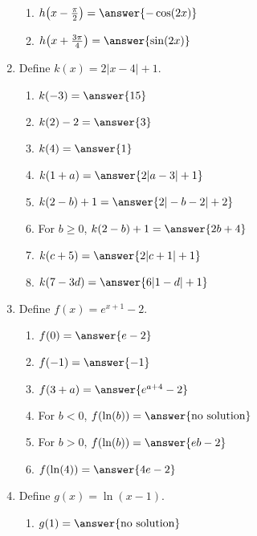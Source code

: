 \documentclass{ximera}
\begin{document}
\begin{exercise}
\begin{enumerate}
\begin{enumerate}
\item $h\!\left(x-\frac{\pi}{2}\right) = \answer{-\cos(2x)}$

\item $h\!\left(x+\frac{3\pi}{4}\right) = \answer{\sin(2x)}$
\end{enumerate}


\item Define $k(x)= 2|x-4|+1$.
\begin{enumerate}
\item $k(-3) = \answer{15}$

\item $k(2) -2 = \answer{3}$

\item $k(4) = \answer{1}$

\item $k(1+a)=\answer{2|a-3| +1}$

\item $k(2-b) +1 = \answer{2|-b-2|+2}$

\item For $b\geq0$, $k(2-b) +1 = \answer{2b+4}$

\item $k(c+5) = \answer{2|c+1|+1}$

\item $k(7-3d) = \answer{6|1-d|+1}$
\end{enumerate}

\item Define $f(x)= e^{x+1} -2$.
\begin{enumerate}
\item $f(0) = \answer{e-2}$

\item $f(-1) = \answer{-1}$

\item $f(3+a)=\answer{e^{a+4}-2}$

\item For $b<0$, $f(\ln(b)) = \answer{\text{no solution}}$

\item For $b>0$, $f(\ln(b)) = \answer{eb-2}$

\item $f(\ln(4)) = \answer{4e-2}$
\end{enumerate}

\item Define $g(x)= \ln(x-1)$.
\begin{enumerate}
\item $g(1) = \answer{\text{no solution}}$


\end{enumerate}
\end{enumerate}
\end{exercise}
\end{document}
